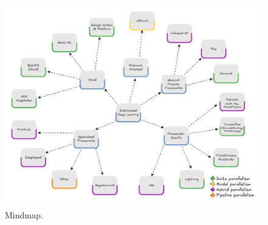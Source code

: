 \begin{figure}[th]
	\centering
	\includegraphics[width=\linewidth]{figures/mindmap}
	\caption{Mindmap.}
	\label{fig:mindmap}
\end{figure}

